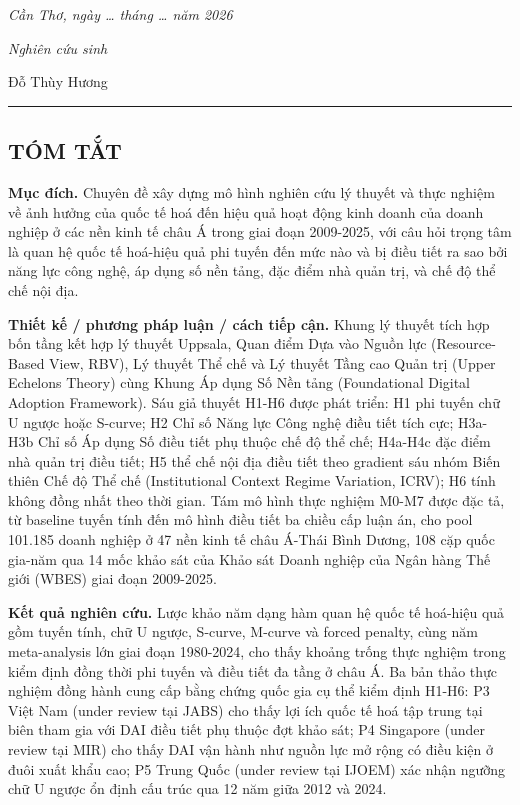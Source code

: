 \documentclass[12pt,a4paper]{article}
\begin{document}
\emph{Cần Thơ, ngày \ldots{} tháng \ldots{} năm 2026}

\emph{Nghiên cứu sinh}

Đỗ Thùy Hương

\begin{center}\rule{0.5\linewidth}{0.5pt}\end{center}

\hypertarget{tuxf3m-tux1eaft}{%
\subsection{TÓM TẮT}\label{tuxf3m-tux1eaft}}

\textbf{Mục đích.} Chuyên đề xây dựng mô hình nghiên cứu lý thuyết và
thực nghiệm về ảnh hưởng của quốc tế hoá đến hiệu quả hoạt động kinh
doanh của doanh nghiệp ở các nền kinh tế châu Á trong giai đoạn
2009-2025, với câu hỏi trọng tâm là quan hệ quốc tế hoá-hiệu quả phi
tuyến đến mức nào và bị điều tiết ra sao bởi năng lực công nghệ, áp dụng
số nền tảng, đặc điểm nhà quản trị, và chế độ thể chế nội địa.

\textbf{Thiết kế / phương pháp luận / cách tiếp cận.} Khung lý thuyết
tích hợp bốn tầng kết hợp lý thuyết Uppsala, Quan điểm Dựa vào Nguồn lực
(Resource-Based View, RBV), Lý thuyết Thể chế và Lý thuyết Tầng cao Quản
trị (Upper Echelons Theory) cùng Khung Áp dụng Số Nền tảng (Foundational
Digital Adoption Framework). Sáu giả thuyết H1-H6 được phát triển: H1
phi tuyến chữ U ngược hoặc S-curve; H2 Chỉ số Năng lực Công nghệ điều
tiết tích cực; H3a-H3b Chỉ số Áp dụng Số điều tiết phụ thuộc chế độ thể
chế; H4a-H4c đặc điểm nhà quản trị điều tiết; H5 thể chế nội địa điều
tiết theo gradient sáu nhóm Biến thiên Chế độ Thể chế (Institutional
Context Regime Variation, ICRV); H6 tính không đồng nhất theo thời gian.
Tám mô hình thực nghiệm M0-M7 được đặc tả, từ baseline tuyến tính đến mô
hình điều tiết ba chiều cấp luận án, cho pool 101.185 doanh nghiệp ở 47
nền kinh tế châu Á-Thái Bình Dương, 108 cặp quốc gia-năm qua 14 mốc khảo
sát của Khảo sát Doanh nghiệp của Ngân hàng Thế giới (WBES) giai đoạn
2009-2025.

\textbf{Kết quả nghiên cứu.} Lược khảo năm dạng hàm quan hệ quốc tế
hoá-hiệu quả gồm tuyến tính, chữ U ngược, S-curve, M-curve và forced
penalty, cùng năm meta-analysis lớn giai đoạn 1980-2024, cho thấy khoảng
trống thực nghiệm trong kiểm định đồng thời phi tuyến và điều tiết đa
tầng ở châu Á. Ba bản thảo thực nghiệm đồng hành cung cấp bằng chứng
quốc gia cụ thể kiểm định H1-H6: P3 Việt Nam (under review tại JABS) cho
thấy lợi ích quốc tế hoá tập trung tại biên tham gia với DAI điều tiết
phụ thuộc đợt khảo sát; P4 Singapore (under review tại MIR) cho thấy DAI
vận hành như nguồn lực mở rộng có điều kiện ở đuôi xuất khẩu cao; P5
Trung Quốc (under review tại IJOEM) xác nhận ngưỡng chữ U ngược ổn định
cấu trúc qua 12 năm giữa 2012 và 2024.
\end{document}
